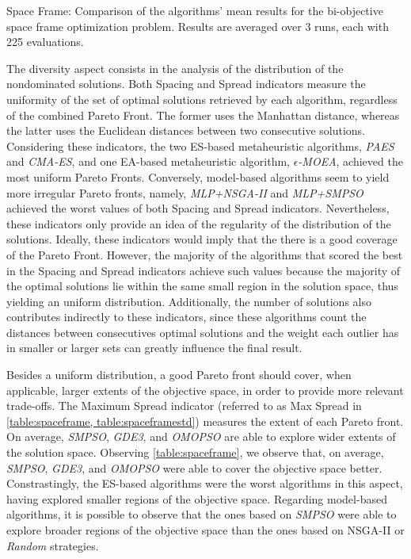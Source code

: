 \begin{table}[htbp]
	\centering
	\caption[Space Frame: Mean performance values of the algorithms' results]{Space Frame: Comparison of the algorithms' mean results for the bi-objective space frame optimization problem. Results are averaged over 3 runs, each with 225 evaluations.}
	\label{table:spaceframe}
\end{table}

The diversity aspect consists in the analysis of the distribution of the nondominated solutions. Both Spacing and Spread indicators measure the uniformity of the set of optimal solutions retrieved by each algorithm, regardless of the combined Pareto Front. The former uses the Manhattan distance, whereas the latter uses the Euclidean distances between two consecutive solutions. Considering these indicators, the two \ac{ES}-based metaheuristic algorithms, \textit{PAES} and \textit{CMA-ES}, and one \ac{EA}-based metaheuristic algorithm, \textit{$\epsilon$-MOEA}, achieved the most uniform Pareto Fronts. Conversely, model-based algorithms seem to yield more irregular Pareto fronts, namely, \textit{MLP+NSGA-II} and \textit{MLP+SMPSO} achieved the worst values of both Spacing and Spread indicators. Nevertheless, these indicators only provide an idea of the regularity of the distribution of the solutions. Ideally, these indicators would imply that the there is a good coverage of the Pareto Front. However, the majority of the algorithms that scored the best in the Spacing and Spread indicators achieve such values because the majority of the optimal solutions lie within the same small region in the solution space, thus yielding an uniform distribution. Additionally, the number of solutions also contributes indirectly to these indicators, since these algorithms count the distances between consecutives optimal solutions and the weight each outlier has in smaller or larger sets can greatly influence the final result.

Besides a uniform distribution, a good Pareto front should cover, when applicable, larger extents of the objective space, in order to provide more relevant trade-offs. The Maximum Spread indicator (referred to as Max Spread in \cref{table:spaceframe, table:spaceframestd}) measures the extent of each Pareto front. On average, \textit{SMPSO}, \textit{GDE3}, and \textit{OMOPSO} are able to explore wider extents of the solution space. Observing \cref{table:spaceframe}, we observe that, on average, \textit{SMPSO}, \textit{GDE3}, and \textit{OMOPSO} were able to cover the objective space better. Constrastingly, the \ac{ES}-based algorithms were the worst algorithms in this aspect, having explored smaller regions of the objective space. Regarding model-based algorithms, it is possible to observe that the ones based on \textit{SMPSO} were able to explore broader regions of the objective space than the ones based on \ac{NSGA-II} or \textit{Random} strategies. 

